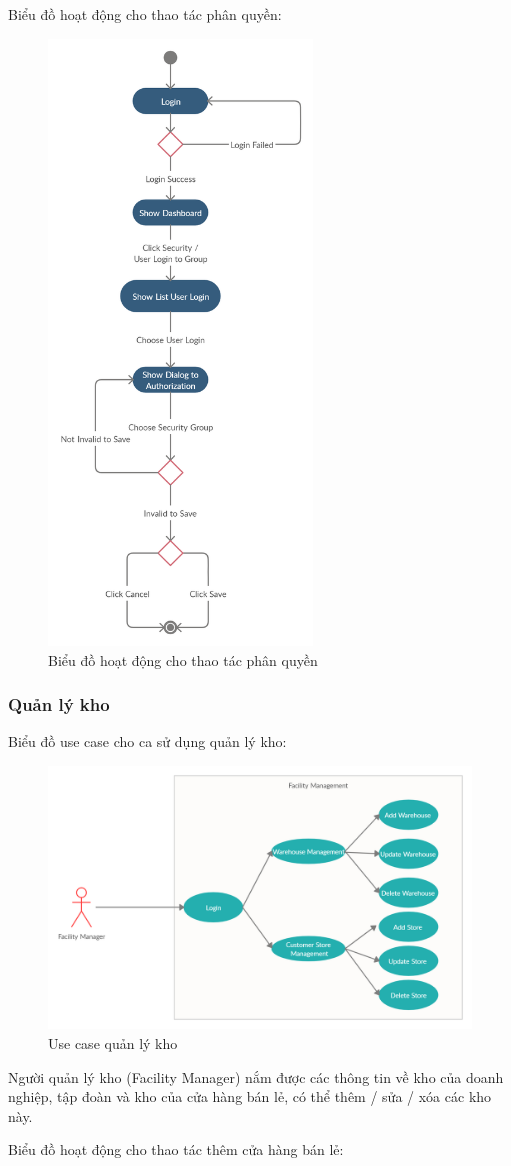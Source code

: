 Biểu đồ hoạt động cho thao tác phân quyền:
\begin{figure}[H]
\centering
\includegraphics[width=7cm]
{images/activity-diagram/assign-permissions.png}
\caption{Biểu đồ hoạt động cho thao tác phân quyền}
\end{figure}

\subsubsection{Quản lý kho}
Biểu đồ use case cho ca sử dụng quản lý kho:
\begin{figure}[H]
\centering
\includegraphics[width=14cm]{images/use-case/facility-management.jpg}
\caption{Use case quản lý kho}
\end{figure}

Người quản lý kho (Facility Manager) nắm được các thông tin
về kho của doanh nghiệp, tập đoàn và kho của cửa hàng bán lẻ,
có thể thêm / sửa / xóa các kho này. 

Biểu đồ hoạt động cho thao tác thêm cửa hàng bán lẻ:
